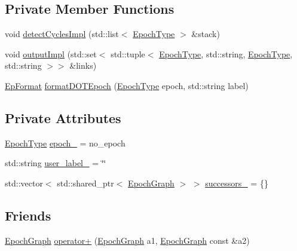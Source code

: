 \subsection*{Private Member Functions}
\begin{DoxyCompactItemize}
\item 
void \hyperlink{structvt_1_1termination_1_1graph_1_1_epoch_graph_aa0627e3c3ec01fca794fca2d2c9fec11}{detect\+Cycles\+Impl} (std\+::list$<$ \hyperlink{namespacevt_a985a5adf291c34a3ca263b3378388236}{Epoch\+Type} $>$ \&stack)
\item 
void \hyperlink{structvt_1_1termination_1_1graph_1_1_epoch_graph_ab789ab171cd6a89f687642263e2ef7b3}{output\+Impl} (std\+::set$<$ std\+::tuple$<$ \hyperlink{namespacevt_a985a5adf291c34a3ca263b3378388236}{Epoch\+Type}, std\+::string, \hyperlink{namespacevt_a985a5adf291c34a3ca263b3378388236}{Epoch\+Type}, std\+::string $>$$>$ \&links)
\item 
\hyperlink{structvt_1_1termination_1_1graph_1_1_epoch_graph_a127b9f54d98b9645451c2d9a2821d10e}{Ep\+Format} \hyperlink{structvt_1_1termination_1_1graph_1_1_epoch_graph_abbdca7798e48c2d4718cfc2bd55e921d}{format\+D\+O\+T\+Epoch} (\hyperlink{namespacevt_a985a5adf291c34a3ca263b3378388236}{Epoch\+Type} epoch, std\+::string label)
\end{DoxyCompactItemize}
\subsection*{Private Attributes}
\begin{DoxyCompactItemize}
\item 
\hyperlink{namespacevt_a985a5adf291c34a3ca263b3378388236}{Epoch\+Type} \hyperlink{structvt_1_1termination_1_1graph_1_1_epoch_graph_a833365232980fd3e2ab084550c6efa20}{epoch\+\_\+} = no\+\_\+epoch
\item 
std\+::string \hyperlink{structvt_1_1termination_1_1graph_1_1_epoch_graph_ab999242f776318d97475ccbe6a362c71}{user\+\_\+label\+\_\+} = \char`\"{}\char`\"{}
\item 
std\+::vector$<$ std\+::shared\+\_\+ptr$<$ \hyperlink{structvt_1_1termination_1_1graph_1_1_epoch_graph}{Epoch\+Graph} $>$ $>$ \hyperlink{structvt_1_1termination_1_1graph_1_1_epoch_graph_ac30660eb1ec7ffc171da6d99b34513ee}{successors\+\_\+} = \{\}
\end{DoxyCompactItemize}
\subsection*{Friends}
\begin{DoxyCompactItemize}
\item 
\hyperlink{structvt_1_1termination_1_1graph_1_1_epoch_graph}{Epoch\+Graph} \hyperlink{structvt_1_1termination_1_1graph_1_1_epoch_graph_a434b99e8fb7dc5980beb1389cb8b5e6e}{operator+} (\hyperlink{structvt_1_1termination_1_1graph_1_1_epoch_graph}{Epoch\+Graph} a1, \hyperlink{structvt_1_1termination_1_1graph_1_1_epoch_graph}{Epoch\+Graph} const \&a2)
\end{DoxyCompactItemize}


